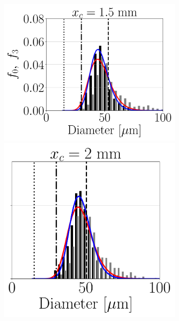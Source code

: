\begin{figure}[ht]
\begin{subfigure}[b]{1.1\textwidth}
	\flushleft
   \includegraphics[scale=0.28]{./part3_applications/figures_ch8_resolved/SPRAY_characterization/histograms_size_volume/DX15_xD05p00_histograms}
   \hspace*{-0.15in}
   \includegraphics[scale=0.28]{./part3_applications/figures_ch8_resolved/SPRAY_characterization/histograms_size_volume/DX15_xD06p67_histograms}

\end{subfigure}
\end{figure}
